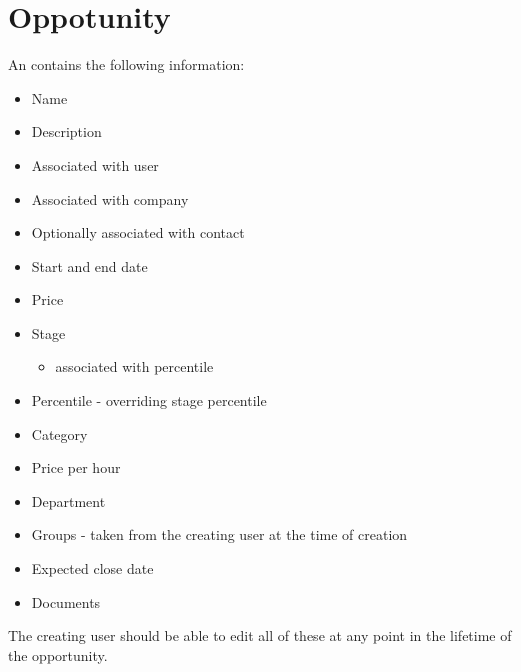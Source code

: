 \chapter{Oppotunity}
\label{app:Oppotunity}

An contains the following information:
\begin{itemize}
  \item Name
  \item Description
  \item Associated with user
  \item Associated with company
  \item Optionally associated with contact
  \item Start and end date
  \item Price
  \item Stage
  \begin{itemize}
    \item associated with percentile
  \end{itemize}
  \item Percentile - overriding stage percentile
  \item Category
  \item Price per hour
  \item Department
  \item Groups - taken from the creating user at the time of creation
  \item Expected close date
  \item Documents
\end{itemize}
The creating user should be able to edit all of these at any point in the lifetime of the opportunity.
